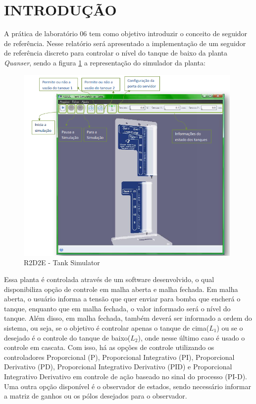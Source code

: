\documentclass[a4paper,12pt]{article}
\begin{document}

\thispagestyle{main}

\section{INTRODUÇÃO}

\hspace{4ex}A prática de laboratório 06 tem como objetivo introduzir o conceito de seguidor de referência. Nesse relatório será apresentado a implementação de um seguidor de referência discreto para controlar o nível do tanque de baixo da planta \textit{Quanser}, sendo a figura \ref{r2d2e} a representação do simulador da planta:

\begin{figure}[H]
\centering
\includegraphics[width=11cm]{ImagensLab4/simulator.png}
\caption{R2D2E - Tank Simulator}
\label{r2d2e}
\end{figure}

\hspace{4ex}Essa planta é controlada através de um software desenvolvido, o qual disponibiliza opção de controle em malha aberta e malha fechada. Em malha aberta, o usuário informa a tensão que quer enviar para bomba que encherá o tanque, enquanto que em malha fechada, o valor informado será o nível do tanque. Além disso, em malha fechada, também deverá ser informado a ordem do sistema, ou seja, se o objetivo é controlar apenas o tanque de cima($L_1$) ou se o desejado é o controle do tanque de baixo($L_2$), onde nesse último caso é usado o controle em cascata. Com isso, há as opções de controle utilizando os controladores Proporcional (P), Proporcional Integrativo (PI), Proporcional Derivativo (PD), Proporcional Integrativo Derivativo (PID) e Proporcional Integrativo Derivativo em controle de ação baseado no sinal do processo (PI-D). Uma outra opção disponível é o observador de estados, sendo necessário informar a matriz de ganhos ou os pólos desejados para o observador.
\end{document}
